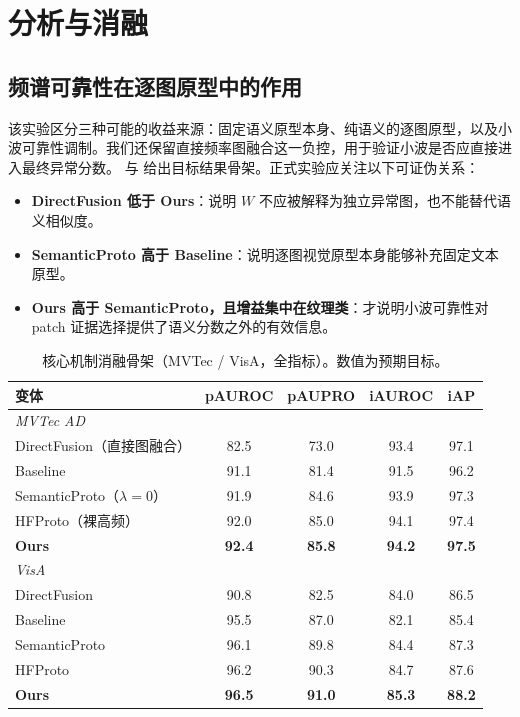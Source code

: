 \section{分析与消融}
\label{sec:analysis}

\subsection{频谱可靠性在逐图原型中的作用}
该实验区分三种可能的收益来源：固定语义原型本身、纯语义的逐图原型，以及小波可靠性调制。我们还保留直接频率图融合这一负控，用于验证小波是否应直接进入最终异常分数。 与  给出目标结果骨架。正式实验应关注以下可证伪关系：
\begin{itemize}[leftmargin=1.4em,itemsep=0.1em,topsep=0.2em]
\item \textbf{DirectFusion 低于 Ours}：说明 $W$ 不应被解释为独立异常图，也不能替代语义相似度。
\item \textbf{SemanticProto 高于 Baseline}：说明逐图视觉原型本身能够补充固定文本原型。
\item \textbf{Ours 高于 SemanticProto，且增益集中在纹理类}：才说明小波可靠性对 patch 证据选择提供了语义分数之外的有效信息。
\end{itemize}

\begin{table}[t]
\centering
\caption{核心机制消融骨架（MVTec / VisA，全指标）。数值为预期目标。}
\label{tab:ablation}
\small
\setlength{\tabcolsep}{4pt}
\begin{tabular}{lcccc}
\toprule
变体 & pAUROC & pAUPRO & iAUROC & iAP \\
\midrule
\multicolumn{5}{l}{\emph{MVTec AD}}\\
DirectFusion（直接图融合） & 82.5 & 73.0 & 93.4 & 97.1 \\
Baseline & 91.1 & 81.4 & 91.5 & 96.2 \\
SemanticProto（$\lambda=0$） & 91.9 & 84.6 & 93.9 & 97.3 \\
HFProto（裸高频） & 92.0 & 85.0 & 94.1 & 97.4 \\
\textbf{Ours} & \textbf{92.4} & \textbf{85.8} & \textbf{94.2} & \textbf{97.5} \\
\midrule
\multicolumn{5}{l}{\emph{VisA}}\\
DirectFusion & 90.8 & 82.5 & 84.0 & 86.5 \\
Baseline & 95.5 & 87.0 & 82.1 & 85.4 \\
SemanticProto & 96.1 & 89.8 & 84.4 & 87.3 \\
HFProto & 96.2 & 90.3 & 84.7 & 87.6 \\
\textbf{Ours} & \textbf{96.5} & \textbf{91.0} & \textbf{85.3} & \textbf{88.2} \\
\bottomrule
\end{tabular}
\end{table}

